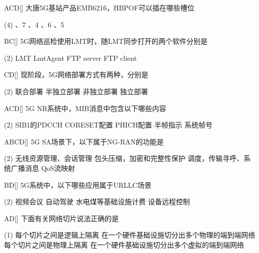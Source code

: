 \begin{choice}{\;ACD\;}[]
    大唐5G基站产品EMB6216，HBPOF可以插在哪些槽位
    \begin{tasks}(4)
        、7
        、4
        、6
        、5
    \end{tasks}
\end{choice}


\begin{choice}{\;BC\;}[]
    5G网络巡检使用LMT时，随LMT同步打开的两个软件分别是
    \begin{tasks}(2)
        \task LMT
        \task LmtAgent
        \task FTP server
        \task FTP client
    \end{tasks}
\end{choice}

\begin{choice}{\;CD\;}[]
    现阶段，5G网络部署方式有两种，分别是
    \begin{tasks}(2)
        \task 联合部署
        \task 半独立部署
        \task 非独立部署
        \task 独立部署
    \end{tasks}
\end{choice}

\begin{choice}{\;ACD\;}[]
    5G NR系统中，MIB消息中包含以下哪些内容
    \begin{tasks}(2)
        \task SIB1的PDCCH CORESET配置
        \task PHICH配置
        \task 半帧指示
        \task 系统帧号
    \end{tasks}
\end{choice}

\begin{choice}{\;ABCD\;}[]
    5G SA场景下，以下属于NG-RAN的功能是
    \begin{tasks}(2)
        \task 无线资源管理、会话管理
        \task 包头压缩，加密和完整性保护
        \task 调度，传输寻呼、系统广播消息
        \task QoS流映射
    \end{tasks}
\end{choice}

\begin{choice}{\;BD\;}[]
    5G系统中，以下哪些应用属于URLLC场景
    \begin{tasks}(2)
        \task 视频会议
        \task 自动驾驶
        \task 水电煤等基础设施计费
        \task 设备远程控制
    \end{tasks}
\end{choice}

\begin{choice}{\;AD\;}[]
    下面有关网络切片说法正确的是
    \begin{tasks}(1)
        \task 每个切片之间是逻辑上隔离
        \task 在一个硬件基础设施切分出多个物理的端到端网络
        \task 每个切片之间是物理上隔离
        \task 在一个硬件基础设施切分出多个虚拟的端到端网络
    \end{tasks}
\end{choice}




